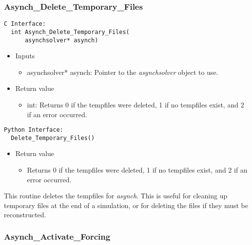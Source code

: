 \documentclass[12pt]{article}
\begin{document}
\subsubsection{Asynch\_Delete\_Temporary\_Files} \label{sec: asynch_delete_temporary_files}

\begin{lstlisting}[style=CStyle]
  C Interface:
  int Asynch_Delete_Temporary_Files(
      asynchsolver* asynch)
\end{lstlisting}
\begin{itemize}
 \item Inputs
  \begin{itemize}
   \item asynchsolver* asynch: Pointer to the \emph{asynchsolver} object to use.
  \end{itemize}
 \item Return value
  \begin{itemize}
   \item int: Returns 0 if the tempfiles were deleted, 1 if no tempfiles exist, and 2 if an error occurred.
  \end{itemize}
\end{itemize}
\begin{lstlisting}[style=PythonStyle]
  Python Interface:
  Delete_Temporary_Files()
\end{lstlisting}
\begin{itemize}
 \item Return value
  \begin{itemize}
   \item Returns 0 if the tempfiles were deleted, 1 if no tempfiles exist, and 2 if an error occurred.
  \end{itemize}
\end{itemize}
This routine deletes the tempfiles for \emph{asynch}. This is useful for cleaning up temporary files at the end of a simulation, or for deleting the files if they must be reconstructed.


\subsubsection{Asynch\_Activate\_Forcing} \label{sec: asynch_activate_forcing}
\end{document}
